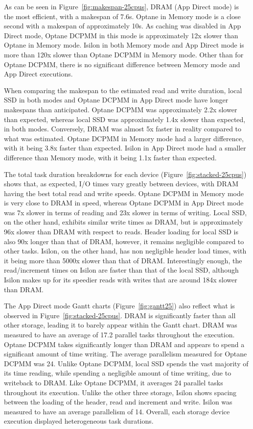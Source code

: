 \documentclass[conference]{IEEEtran}
\begin{document}
As can be seen in Figure~\ref{fig:makespan-25cpus}, DRAM (App Direct mode) is the 
most efficient, with a makespan of 7.6s. Optane in Memory mode is a close second
with a makespan of approximately 10s. As caching was disabled in App Direct mode, 
Optane DCPMM in this mode is approximately 
12x slower than Optane in Memory mode. Isilon in both Memory mode and App Direct 
mode is more than 120x slower than Optane DCPMM in Memory mode. Other than for Optane DCPMM, 
there is no significant difference between Memory mode and App Direct executions.

When comparing the makespan to the estimated read and write duration, local SSD
in both modes and Optane DCPMM in App Direct mode have longer makespans than anticipated.
Optane DCPMM was approximately 2.2x slower than expected, whereas local SSD was approximately
1.4x slower than expected, in both modes. Conversely,
DRAM was almost 5x faster in reality compared to what was estimated. Optane DCPMM in Memory mode
had a larger difference, with it being 3.8x faster than expected. Isilon in App Direct
mode had a smaller difference than Memory mode, with it being 1.1x faster than expected.


The total task duration breakdowns for each device (Figure~\ref{fig:stacked-25cpus})
shows that, as expected, I/O times vary greatly between devices, with DRAM having the
best total read and write speeds. Optane DCPMM in Memory mode is very close to DRAM in speed,
whereas Optane DCPMM in App Direct mode was 7x slower in terms of reading and 23x slower in terms
of writing. Local SSD, on the other hand, exhibits similar write times as DRAM, but is
approximately 96x slower than DRAM with respect to reads. Header loading for local SSD is also 90x longer
than that of DRAM, however, it remains negligible compared to other tasks. Isilon, on the 
other hand, has non negligible header load times, with it being more than 5000x
slower than that of DRAM. Interestingly enough, the read/increment times on Isilon are
faster than that of the local SSD, although Isilon makes up for its speedier reads with 
writes that are around 184x slower than DRAM.


The App Direct mode Gantt charts (Figure~\ref{fig:gantt25}) also reflect what is observed in Figure~\ref{fig:stacked-25cpus}.
DRAM is significantly faster than all other storage, leading it to barely appear within the Gantt chart.
DRAM was measured to have an average of 17.2 parallel tasks throughout the execution. Optane DCPMM takes
significantly longer than DRAM and appears to spend a significant amount of time writing. The average
parallelism measured for Optane DCPMM was 24. Unlike Optane DCPMM, local SSD spends the vast majority of its time
reading, while spending a negligible amount of time writing, due to writeback to DRAM. Like Optane DCPMM, it averages 24 parallel tasks
throughout its execution. Unlike the other three storage, Isilon shows spacing between the loading of the header,
read and increment and write. Isilon was measured to have an average parallelism of 14. Overall, each storage device
execution displayed heterogeneous task durations.
\end{document}
